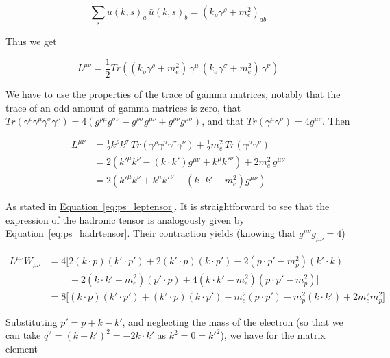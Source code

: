 \documentclass[a4paper,10pt]{report}
\newcommand{\eqlabel}{{Equation}}
\newcommand{\equref}[1]{\hyperref[#1]{\eqlabel~\ref*{#1}}}
\begin{document}
\begin{equation}
  \sum_{s} u(k,s)_a\,\bar{u}(k,s)_b = (k_{\rho}\gamma^{\rho} + m_e^2)_{ab}
\end{equation}

Thus we get

\begin{equation}
  L^{\mu \nu} = \frac{1}{2}Tr\left((k_{\rho}\gamma^{\rho} + m_e^2)\,\gamma^\mu\,
  (k_{\sigma}\gamma^{\sigma} + m_e^2)\,\gamma^\nu\right)
\end{equation}

We have to use the properties of the trace of gamma matrices, notably that the trace of an 
odd amount of gamma matrices is zero, that $Tr\left(\gamma^\rho\gamma^\mu\gamma^\sigma\gamma^\nu\right) = 
4\left(g^{\rho \mu}g^{\sigma \nu} - g^{\rho \sigma}g^{\mu \nu} + g^{\rho \nu}g^{\mu \sigma}\right)$, 
and that $Tr\left(\gamma^\mu\gamma^\nu\right) = 4g^{\mu \nu}$. Then

\begin{align}
  L^{\mu \nu} &= \frac{1}{2}k^\rho k^\sigma\, Tr\left(\gamma^\rho\gamma^\mu\gamma^\sigma\gamma^\nu\right) + \frac{1}{2}m_e^2\,Tr(\gamma^\mu \gamma^\nu) \nonumber \\
  &= 2(k'^{\mu}k^{\nu} - (k\cdot k')g^{\mu \nu} + k^{\mu}k'^{\nu}) + 2m_e^2\,g^{\mu \nu} \nonumber \\
  &= 2(k'^{\mu}k^{\nu} + k^{\mu}k'^{\nu} - (k\cdot k' - m_e^2)g^{\mu \nu})
\end{align}

As stated in \equref{eq:ps_leptensor}. It is straightforward to see that the expression of the hadronic tensor is analogously given 
by \equref{eq:ps_hadrtensor}. Their contraction yields (knowing that $g^{\mu \nu}g_{\mu \nu} = 4$)

\begin{align}
  L^{\mu \nu}W_{\mu \nu} &= 4\Big[ 2(k\cdot p)(k'\cdot p') + 2(k'\cdot p)(k\cdot p') - 2(p\cdot p' - m_p^2)(k'\cdot k) \nonumber \\ 
  &\quad \quad \, - 2(k\cdot k' - m_e^2)(p'\cdot p) + 4(k\cdot k' - m_e^2)(p\cdot p' - m_p^2) \Big] \nonumber\\ 
  &= 8\Big[(k\cdot p)(k'\cdot p') + (k'\cdot p)(k\cdot p') - m_e^2(p\cdot p') -m_p^2(k\cdot k') +2m^2_e m_p^2 \Big]
\end{align}

Substituting $p' = p + k -k'$, and neglecting the mass of the electron (so that we can take $q^2 = (k-k')^2 = -2k\cdot k'$ as $k^2 = 0 = k'^2$), we 
have for the matrix element 
\end{document}
